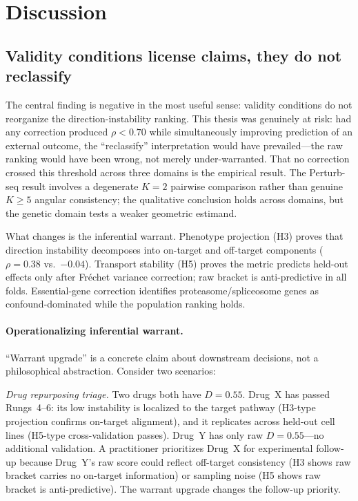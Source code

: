 \documentclass{article}
\begin{document}
\section{Discussion}

\subsection{Validity conditions license claims, they do not reclassify}

The central finding is negative in the most useful sense: validity conditions
do not reorganize the direction-instability ranking. This thesis was
genuinely at risk: had any correction produced $\rho < 0.70$ while
simultaneously improving prediction of an external outcome, the
``reclassify'' interpretation would have prevailed---the raw ranking
would have been wrong, not merely under-warranted. That no correction
crossed this threshold across three domains is the empirical result.
The Perturb-seq result involves a degenerate $K = 2$ pairwise comparison
rather than genuine $K \geq 5$ angular consistency; the qualitative
conclusion holds across domains, but the genetic domain tests a weaker
geometric estimand.

What changes is the inferential warrant. Phenotype projection (H3) proves
that direction instability decomposes into on-target and off-target
components ($\rho = 0.38$ vs.\ $-0.04$). Transport stability (H5) proves
the metric predicts held-out effects only after Fr\'{e}chet variance
correction; raw bracket is anti-predictive in all folds. Essential-gene
correction identifies proteasome/spliceosome genes as confound-dominated
while the population ranking holds.

\paragraph{Operationalizing inferential warrant.}
``Warrant upgrade'' is a concrete claim about downstream decisions, not
a philosophical abstraction. Consider two scenarios:

\emph{Drug repurposing triage.} Two drugs both have $D = 0.55$.
Drug~X has passed Rungs~4--6: its low instability is localized to the
target pathway (H3-type projection confirms on-target alignment), and it
replicates across held-out cell lines (H5-type cross-validation passes).
Drug~Y has only raw $D = 0.55$---no additional validation. A practitioner
prioritizes Drug~X for experimental follow-up because Drug~Y's raw score
could reflect off-target consistency (H3 shows raw bracket carries no
on-target information) or sampling noise (H5 shows raw bracket is
anti-predictive). The warrant upgrade changes the follow-up priority.
\end{document}
